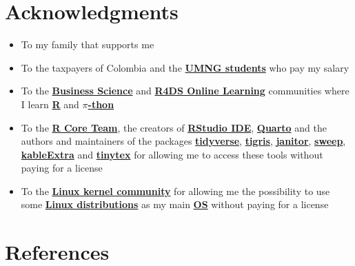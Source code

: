 \documentclass[
  ignorenonframetext,
]{beamer}
\begin{document}
\section{Acknowledgments}\label{acknowledgments}

\begin{frame}{}
\label{section-13}
\begin{itemize}
\item
  To my family that supports me
\item
  To the taxpayers of Colombia and the
  \href{https://www.umng.edu.co/estudiante}{\textbf{UMNG students}} who
  pay my salary
\item
  To the \href{https://www.business-science.io/}{\textbf{Business
  Science}} and \href{https://www.rfordatasci.com/}{\textbf{R4DS Online
  Learning}} communities where I learn
  \href{https://www.r-project.org/about.html}{\textbf{R}} and
  \href{https://www.python.org/about/}{\textbf{\(\pi\)-thon}}
\item
  To the \href{https://www.r-project.org/contributors.html}{\textbf{R
  Core Team}}, the creators of
  \href{https://posit.co/products/open-source/rstudio/}{\textbf{RStudio
  IDE}}, \href{https://quarto.org/}{\textbf{Quarto}} and the authors and
  maintainers of the packages
  \href{https://CRAN.R-project.org/package=tidyverse}{\textbf{tidyverse}},
  \href{https://CRAN.R-project.org/package=tigris}{\textbf{tigris}},
  \href{https://CRAN.R-project.org/package=janitor}{\textbf{janitor}},
  \href{https://CRAN.R-project.org/package=sweep}{\textbf{sweep}},
  \href{https://CRAN.R-project.org/package=kableExtra}{\textbf{kableExtra}}
  and
  \href{https://CRAN.R-project.org/package=tinytex}{\textbf{tinytex}}
  for allowing me to access these tools without paying for a license
\item
  To the \href{https://www.kernel.org/category/about.html}{\textbf{Linux
  kernel community}} for allowing me the possibility to use some
  \href{https://static.lwn.net/Distributions/}{\textbf{Linux
  distributions}} as my main
  \href{https://en.wikipedia.org/wiki/Operating_system}{\textbf{OS}}
  without paying for a license
\end{itemize}
\end{frame}

\section*{References}\label{references}
\end{document}
